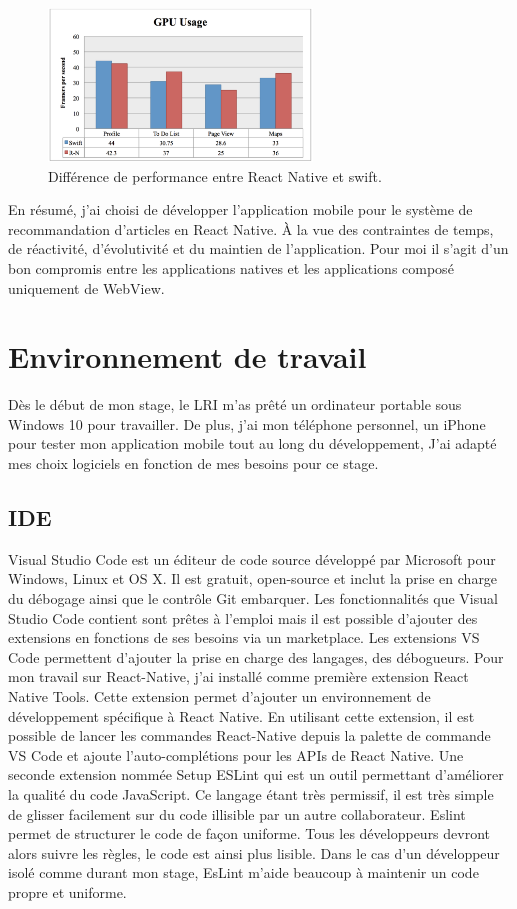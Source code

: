 \begin{figure}[htp]
  \centering
  \includegraphics[width=7cm]{images/GPUusage}
  \caption{Différence de performance entre React Native et swift.}
  \label{fig:performance}
\end{figure}

En résumé, j'ai choisi de développer l'application mobile pour le système de recommandation d'articles en React Native. À la vue des contraintes de temps, de réactivité, d'évolutivité et du maintien de l’application. Pour moi il s'agit d'un bon compromis entre les applications natives et les applications composé uniquement de WebView.  


\section{Environnement de travail}

Dès le début de mon stage, le LRI m'as prêté un ordinateur portable sous Windows 10 pour travailler. De plus, j’ai mon téléphone personnel, un iPhone pour tester mon application mobile tout au long du développement, J’ai adapté mes choix logiciels en fonction de mes besoins pour ce stage.  

\subsection{IDE}

Visual Studio Code est un éditeur de code source développé par Microsoft pour Windows, Linux et OS X. Il est gratuit, open-source et inclut la prise en charge du débogage ainsi que le contrôle Git embarquer. Les fonctionnalités que Visual Studio Code contient sont prêtes à l'emploi mais il est possible d'ajouter des extensions en fonctions de ses besoins via un marketplace. Les extensions VS Code permettent d'ajouter la prise en charge des langages, des débogueurs. Pour mon travail sur React-Native,  j'ai installé comme première extension React Native Tools. Cette extension permet d'ajouter un environnement de développement spécifique à React Native. En utilisant cette extension, il est possible de lancer les commandes React-Native depuis la palette de commande VS Code et ajoute l’auto-complétions pour les APIs de React Native. Une seconde extension nommée Setup ESLint qui est un outil permettant d’améliorer la qualité du code JavaScript. Ce langage étant très permissif, il est très simple de glisser facilement sur du code illisible par un autre collaborateur. Eslint permet de structurer le code de façon uniforme. Tous les développeurs devront alors suivre les règles, le code est ainsi plus lisible. Dans le cas d'un développeur isolé comme durant mon stage, EsLint m’aide beaucoup à maintenir un code propre et uniforme.

